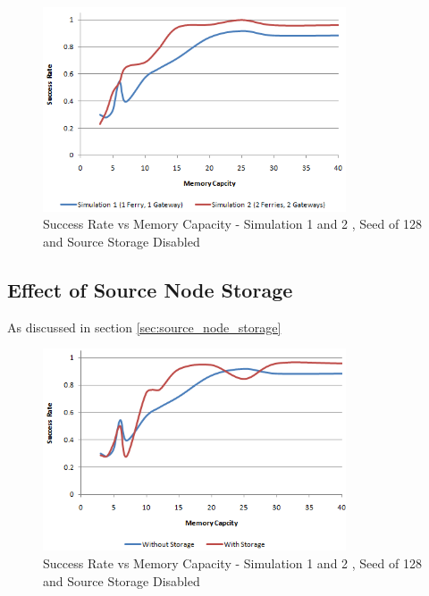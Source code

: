 \begin{figure}[htbp]
    \centering
    \includegraphics[width=0.8\textwidth]{images/result_sccess_bothsim_128_dss}
    \caption{Success Rate vs Memory Capacity - Simulation 1 and 2 , Seed of 128 and Source Storage Disabled}
    \label{fig:result_sccess_bothsim_128_dss}
\end{figure}

\subsection{Effect of Source Node Storage}

As discussed in section \ref{sec:source_node_storage}
\begin{figure}[htbp]
    \centering
    \includegraphics[width=0.8\textwidth]{images/result_sccess_sim1byss_128}
    \caption{Success Rate vs Memory Capacity - Simulation 1 and 2 , Seed of 128 and Source Storage Disabled}
\end{figure}

